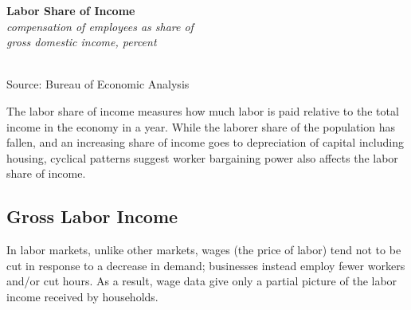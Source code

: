 \documentclass{report}
\makeatletter
\newcommand{\tbllink}[1]{\href{https://raw.githubusercontent.com/bdecon/US-chartbook/master/chartbook/data/#1}{\faTable}}
\newcommand*\short[1]{\expandafter\@gobbletwo\number\numexpr#1\relax}
\newcommand{\shdateaxisticks}{
		date coordinates in=x, axis line style={draw=none},
		xmax={2021-02-01},
		max space between ticks=40,	    
		xtick={{1990-01-01}, {1995-01-01}, {2000-01-01}, 
			{2005-01-01}, {2010-01-01}, {2015-01-01}, {2020-01-01}},
		minor xtick={},
		enlarge y limits={0.06}, enlarge x limits={0.01},
		}
\newcommand{\stdline}[4]{\addplot[very thick, no markers, color=#1] 
		table [x=#2, y=#3, col sep=comma] {#4};	}
\newcommand{\rbars}{
		\fill[color=black!10] (axis cs:{1990-07-01},\pgfkeysvalueof{/pgfplots/ymin}) rectangle 
			(axis cs:{1991-03-01}, \pgfkeysvalueof{/pgfplots/ymax});
		\fill[color=black!10] (axis cs:{2007-12-01},\pgfkeysvalueof{/pgfplots/ymin}) rectangle 
			(axis cs:{2009-07-01}, \pgfkeysvalueof{/pgfplots/ymax});
		\fill[color=black!10] (axis cs:{2001-03-01},\pgfkeysvalueof{/pgfplots/ymin}) rectangle 
			(axis cs:{2001-11-01}, \pgfkeysvalueof{/pgfplots/ymax});}
\makeatother
\begin{document}
{{{{{{{\begin{minipage}{0.325\textwidth}
\noindent \normalsize \textbf{Labor Share of Income}\\
\footnotesize{\textit{compensation of employees as share of}}\\
\footnotesize{\textit{gross domestic income, percent}}\\
\noindent \hspace*{-2mm} \\
\footnotesize{Source: Bureau of Economic Analysis} \hspace{2mm} \tbllink{laborshare.csv}\\
\end{minipage}\hspace{7mm}
\begin{minipage}{0.38\textwidth}
\small The labor share of income measures how much labor is paid relative to the total income in the economy in a year. While the laborer share of the population has fallen, and an increasing share of income goes to depreciation of capital including housing, cyclical patterns suggest worker bargaining power also affects the labor share of income.  
\end{minipage}

\vspace{4mm}


\subsection*{\color{black!70} \seriffont Gross Labor Income}

\begin{minipage}{0.76\textwidth}

\small In labor markets, unlike other markets, wages (the price of labor) tend not to be cut in response to a decrease in demand; businesses instead employ fewer workers and/or cut hours. As a result, wage data give only a partial picture of the labor income received by households.\\


\end{minipage}}}}}}}}
\end{document}
